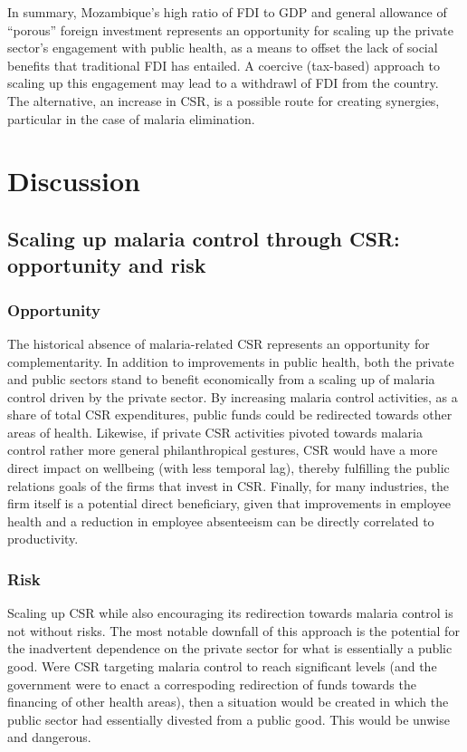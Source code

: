 \documentclass[]{elsarticle} %
\begin{document}
In summary, Mozambique's high ratio of FDI to GDP and general allowance
of ``porous'' foreign investment represents an opportunity for scaling
up the private sector's engagement with public health, as a means to
offset the lack of social benefits that traditional FDI has entailed. A
coercive (tax-based) approach to scaling up this engagement may lead to
a withdrawl of FDI from the country. The alternative, an increase in
CSR, is a possible route for creating synergies, particular in the case
of malaria elimination.

\section{Discussion}\label{discussion}

\subsection{Scaling up malaria control through CSR: opportunity and
risk}\label{scaling-up-malaria-control-through-csr-opportunity-and-risk}

\subsubsection{Opportunity}\label{opportunity}

The historical absence of malaria-related CSR represents an opportunity
for complementarity. In addition to improvements in public health, both
the private and public sectors stand to benefit economically from a
scaling up of malaria control driven by the private sector. By
increasing malaria control activities, as a share of total CSR
expenditures, public funds could be redirected towards other areas of
health. Likewise, if private CSR activities pivoted towards malaria
control rather more general philanthropical gestures, CSR would have a
more direct impact on wellbeing (with less temporal lag), thereby
fulfilling the public relations goals of the firms that invest in CSR.
Finally, for many industries, the firm itself is a potential direct
beneficiary, given that improvements in employee health and a reduction
in employee absenteeism can be directly correlated to productivity.

\subsubsection{Risk}\label{risk}

Scaling up CSR while also encouraging its redirection towards malaria
control is not without risks. The most notable downfall of this approach
is the potential for the inadvertent dependence on the private sector
for what is essentially a public good. Were CSR targeting malaria
control to reach significant levels (and the government were to enact a
correspoding redirection of funds towards the financing of other health
areas), then a situation would be created in which the public sector had
essentially divested from a public good. This would be unwise and
dangerous.
\end{document}
